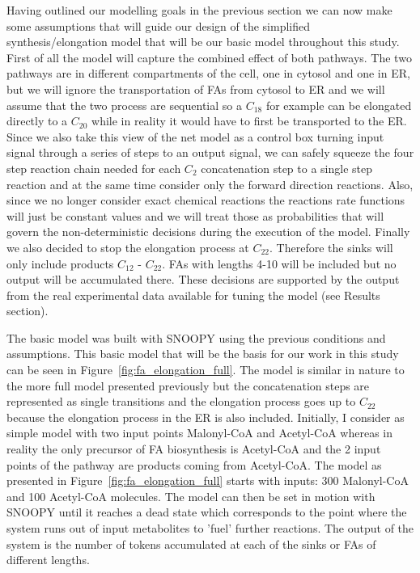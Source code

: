Having outlined our modelling goals in the previous section we can now
make some assumptions that will guide our design of the simplified
synthesis/elongation model that will be our basic model throughout
this study. First of all the model will capture the combined effect of
both pathways. The two pathways are in different compartments of
the cell, one in cytosol and one in ER, but we will ignore the
transportation of FAs from cytosol to ER and we will assume that the
two process are sequential so a $C_{18}$ for example can be elongated
directly to a $C_{20}$ while in reality it would have to first be
transported to the ER. Since we also take this view of the
net model as a control box turning input signal through a series of
steps to an output signal, we can safely squeeze the four step reaction chain
needed for each $C_2$ concatenation step to a single step reaction and
at the same time consider only the forward direction
reactions. Also, since we no longer consider exact chemical
reactions the reactions rate functions will just be constant values
and we will treat those as probabilities that will govern the
non-deterministic decisions during the execution of the model. Finally we
also decided to stop the elongation process at $C_{22}$. Therefore the
sinks will only include products $C_{12}$ - $C_{22}$. FAs with lengths
4-10 will be included but no output will be accumulated there. These
decisions are supported by the output from the real experimental data available
for tuning the model (see
Results section).

The basic model was built with SNOOPY \cite [] {heiner2012snoopy} using the previous conditions and assumptions. This basic model that will
be the basis for our work in this study can be seen in
Figure~\ref{fig:fa_elongation_full}. The model is similar in nature to
the more full model presented previously but the concatenation steps
are represented as single transitions and the elongation process goes
up to $C_{22}$ because the elongation process in the ER is also
included. Initially, I consider as simple model with two input points Malonyl-CoA
and Acetyl-CoA whereas in reality the only precursor of FA
biosynthesis is Acetyl-CoA and the 2 input points of the pathway are
products coming from Acetyl-CoA. The model as presented in
Figure~\ref{fig:fa_elongation_full} starts with inputs: 300
Malonyl-CoA and 100 Acetyl-CoA molecules. The model can then be set in
motion with SNOOPY until it reaches a dead state which 
corresponds to the point where the system runs out of input
metabolites to 'fuel' further reactions. The output of the system
is the number of tokens accumulated at each of the sinks or FAs of
different lengths.

